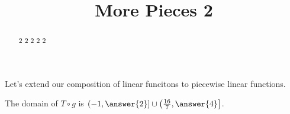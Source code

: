 \documentclass{ximera}
\title {More Pieces 2}
\begin{document}
\begin{abstract}
2 2 2 2 2 
\end{abstract}
\maketitle





Let's extend our composition of linear funcitons to piecewise linear functions.



The domain of $T \circ g$ is $\left( -1, \answer{2} \right] \cup \left( \frac{16}{7}, \answer{4} \right]$.
\end{document}
